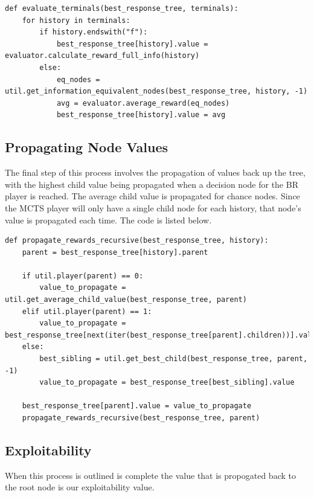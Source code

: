 \begin{lstlisting}[style=Python]
def evaluate_terminals(best_response_tree, terminals):
    for history in terminals:
        if history.endswith("f"):
            best_response_tree[history].value = evaluator.calculate_reward_full_info(history)
        else:
            eq_nodes = util.get_information_equivalent_nodes(best_response_tree, history, -1)
            avg = evaluator.average_reward(eq_nodes)
            best_response_tree[history].value = avg
\end{lstlisting}

\subsection{Propagating Node Values}\label{subsec:propagateTerminals}
The final step of this process involves the propagation of values back up the tree, with the highest
child value being propagated when a decision node for the BR player is reached.
The average child value is propagated for chance nodes.
Since the MCTS player will only have a single child node for each history, that node's value is
propagated each time.
The code is listed below.

\begin{lstlisting}[style=Python]
def propagate_rewards_recursive(best_response_tree, history):
    parent = best_response_tree[history].parent

    if util.player(parent) == 0:
        value_to_propagate = util.get_average_child_value(best_response_tree, parent)
    elif util.player(parent) == 1:
        value_to_propagate = best_response_tree[next(iter(best_response_tree[parent].children))].value
    else:
        best_sibling = util.get_best_child(best_response_tree, parent, -1)
        value_to_propagate = best_response_tree[best_sibling].value

    best_response_tree[parent].value = value_to_propagate
    propagate_rewards_recursive(best_response_tree, parent)
\end{lstlisting}

\subsection{Exploitability}\label{subsec:exploitability}
When this process is outlined is complete the value that is propogated back to the
root node is our exploitability value.


